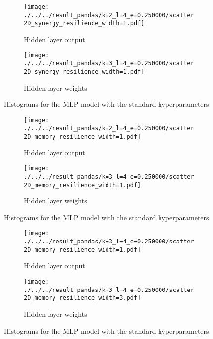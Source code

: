 \documentclass[../main.tex]{subfiles}
\begin{document}
\begin{figure}[H]
    \centering
    \begin{subfigure}[b]{0.4\textwidth}
        \texttt{[image: ./../../result\_pandas/k=2\_l=4\_e=0.250000/scatter2D\_synergy\_resilience\_width=1.pdf]}
        \caption{Hidden layer output}
    \end{subfigure}
    \begin{subfigure}[b]{0.4\textwidth}
        \texttt{[image: ./../../result\_pandas/k=3\_l=4\_e=0.250000/scatter2D\_synergy\_resilience\_width=1.pdf]}
        \caption{Hidden layer weights}
    \end{subfigure}
    \caption{Histograms for the MLP model with the standard hyperparameters}
    \label{fig:regular_hid}
\end{figure}



\begin{figure}[H]
    \centering
    \begin{subfigure}[b]{0.4\textwidth}
        \texttt{[image: ./../../result\_pandas/k=2\_l=4\_e=0.250000/scatter2D\_memory\_resilience\_width=1.pdf]}
        \caption{Hidden layer output}
    \end{subfigure}
    \begin{subfigure}[b]{0.4\textwidth}
        \texttt{[image: ./../../result\_pandas/k=3\_l=4\_e=0.250000/scatter2D\_memory\_resilience\_width=1.pdf]}
        \caption{Hidden layer weights}
    \end{subfigure}
    \caption{Histograms for the MLP model with the standard hyperparameters}
    \label{fig:regular_hid}
\end{figure}

\begin{figure}[H]
    \centering
    \begin{subfigure}[b]{0.4\textwidth}
        \texttt{[image: ./../../result\_pandas/k=3\_l=4\_e=0.250000/scatter2D\_memory\_resilience\_width=1.pdf]}
        \caption{Hidden layer output}
    \end{subfigure}
    \begin{subfigure}[b]{0.4\textwidth}
        \texttt{[image: ./../../result\_pandas/k=3\_l=4\_e=0.250000/scatter2D\_memory\_resilience\_width=3.pdf]}
        \caption{Hidden layer weights}
    \end{subfigure}
    \caption{Histograms for the MLP model with the standard hyperparameters}
    \label{fig:regular_hid}
\end{figure}
\end{document}

